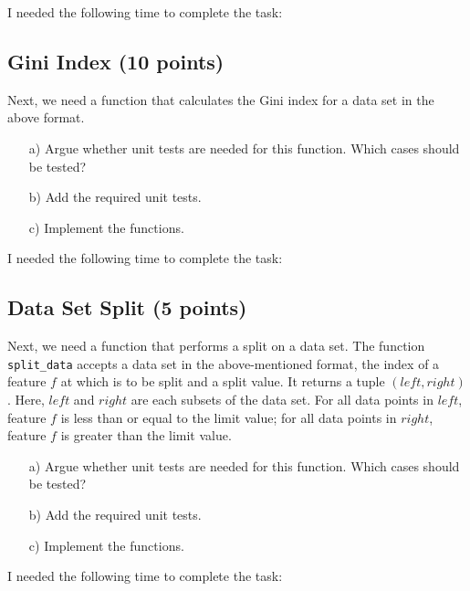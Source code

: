 I needed the following time to complete the task:

\subsection{Gini Index (10 points)}

Next, we need a function that calculates the Gini index for a data set in the above format. 

\begin{enumerate}

\item[a)] Argue whether unit tests are needed for this function. Which cases should be tested?

\item[b)] Add the required unit tests.

\item[c)] Implement the functions.

\end{enumerate}

I needed the following time to complete the task:

\subsection{Data Set Split (5 points)}

Next, we need a function that performs a split on a data set. The function \texttt{split\_data} accepts a data set in the above-mentioned format, the index of a feature $f$ at which
is to be split and a split value. It returns a tuple $(left, right)$. Here, $left$ and $right$ are each subsets of the data set. For all data points in $left$, feature $f$ is less than or equal to the limit value; for all data points in $right$, feature $f$ is greater than the limit value.

\begin{enumerate}

\item[a)] Argue whether unit tests are needed for this function. Which cases should be tested?

\item[b)] Add the required unit tests.

\item[c)] Implement the functions.

\end{enumerate}

I needed the following time to complete the task:

